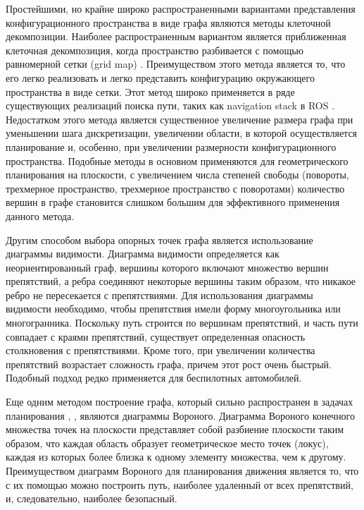 Простейшими, но крайне широко распространенными вариантами представления конфигурационного пространства
в виде графа являются методы клеточной декомпозиции. Наиболее распространенным вариантом является приближенная клеточная
декомпозиция, когда пространство разбивается с помощью равномерной сетки (grid map)
\cite{motion_planning_overview_obstacles}. Преимуществом этого метода является то, что его легко реализовать и легко
представить конфигурацию окружающего пространства в виде сетки. Этот метод широко применяется в ряде существующих
реализаций поиска пути, таких как navigation stack в ROS \cite{ros_navigation}. Недостатком этого метода является существенное
увеличение размера графа при уменьшении шага дискретизации, увеличении области, в которой осуществляется планирование и,
особенно, при увеличении размерности  конфигурационного пространства. Подобные методы в основном применяются для
геометрического планирования на плоскости, с увеличением числа степеней свободы (повороты, трехмерное пространство,
трехмерное пространство с поворотами) количество вершин в графе становится слишком большим для эффективного применения
данного метода.

Другим способом выбора опорных точек графа является использование диаграммы видимости.
\cite{motion_planning_overview_obstacles} Диаграмма видимости определяется как неориентированный граф, вершины которого
включают множество вершин препятствий, а ребра соединяют некоторые вершины таким образом, что никакое ребро не
пересекается с препятствиями. Для использования диаграммы видимости необходимо, чтобы препятствия имели форму
многоугольника или многогранника. Поскольку путь строится по вершинам препятствий, и часть пути совпадает с краями
препятствий, существует определенная опасность столкновения с препятствиями. Кроме того, при увеличении количества
препятствий возрастает сложность графа, причем этот рост очень быстрый. Подобный подход редко применяется для
беспилотных автомобилей.

Еще одним методом построение графа, который сильно распространен в задачах планирования \cite{darpa_annieway_navigation},
\cite{motion_planning_overview_obstacles}, являются диаграммы Вороного. Диаграмма Вороного конечного множества точек на
плоскости представляет собой разбиение плоскости таким образом, что каждая область образует геометрическое место точек
(локус), каждая из которых более близка к одному элементу множества, чем к другому. Преимуществом диаграмм Вороного для
планирования движения является то, что с их помощью можно построить путь, наиболее удаленный от всех препятствий, и,
следовательно, наиболее безопасный.

